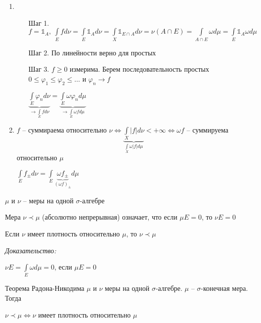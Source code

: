 \documentclass[12pt]{article}
\begin{document}
\begin{enumerate}
    \item \  
    
    \begin{itemize}
        \item[Шаг 1. ] $f = \mathbb{1}_A,\ \int\limits_E fd\nu = \int\limits_E \mathbb{1}_A d\nu = \int\limits_X \mathbb{1}_{E \cap A} d\nu = \nu(A \cap E) = \int\limits_{A \cap E} \omega d\mu = \int\limits_E \mathbb{1}_A \omega d\mu$
        \item[Шаг 2. ] По линейности верно для простых 
        \item[Шаг 3. ] $f \geq 0$ измерима. Берем последовательность простых $0 \leq \varphi_1 \leq \varphi_2 \leq \ldots$ и $\varphi_n \to f$
        
        $\underbrace{\int\limits_E \varphi_n d\nu}_{\to \int\limits_E fd\nu} = \underbrace{\int\limits_E \omega \varphi_n d\mu}_{\to \int\limits_E \omega fd\mu}$
    \end{itemize}

    \item $f$ -- суммираема относительно $\nu \Leftrightarrow \underbrace{\int\limits_X |f|d\nu}_{\int\limits_X \omega |f|d\mu} < + \infty \Leftrightarrow \omega f$ -- суммируема относительно $\mu$
    
    $\int\limits_E f_\pm d\nu = \int\limits_E \underbrace{\omega f_\pm}_{(\omega f)_\pm} d\mu$ 
\end{enumerate}

\begin{defin}{}
    $\mu$ и $\nu$ -- меры на одной $\sigma$-алгебре 

    Мера $\nu \prec \mu$ (абсолютно непрерывная) означает, что если $\mu E = 0$, то $\nu E = 0$
\end{defin}

\begin{Remark}{}
    Если $\nu$ имеет плотность относительно $\mu$, то $\nu \prec \mu$
\end{Remark}

\textit{Доказательство:}

$\nu E = \int\limits_E \omega d\mu = 0$, если $\mu E = 0$

\begin{theo}{Теорема Радона-Никодима}
    $\mu$ и $\nu$ меры на одной $\sigma$-алгебре. $\mu$ -- $\sigma$-конечная мера. Тогда 

    $\nu \prec \mu \Leftrightarrow \nu$ имеет плотность относительно $\mu$
\end{theo}
\end{document}
